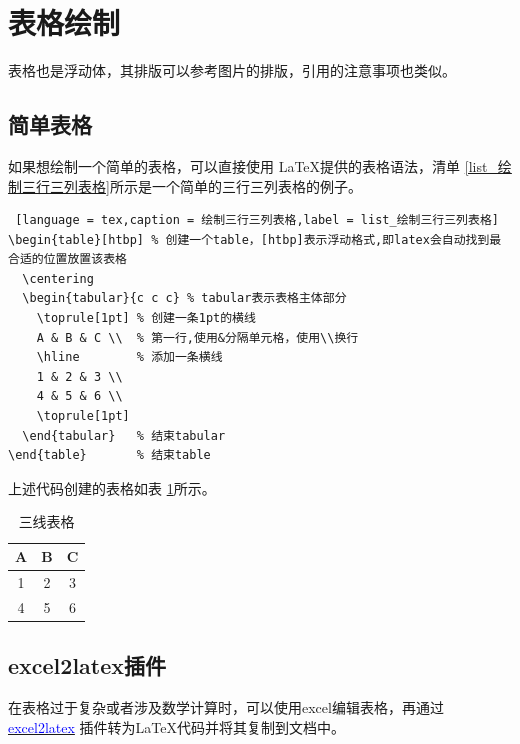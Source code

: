 \documentclass[AutoFakeBold]{ZafuThesis}
\begin{document}
\section{表格绘制}
表格也是浮动体，其排版可以参考图片的排版，引用的注意事项也类似。\par
\subsection{简单表格}
如果想绘制一个简单的表格，可以直接使用 \LaTeX 提供的表格语法，清单 \ref{list_绘制三行三列表格}所示是一个简单的三行三列表格的例子。

\begin{lstlisting} [language = tex,caption = 绘制三行三列表格,label = list_绘制三行三列表格]
\begin{table}[htbp] % 创建一个table，[htbp]表示浮动格式,即latex会自动找到最合适的位置放置该表格
  \centering
  \begin{tabular}{c c c} % tabular表示表格主体部分    
    \toprule[1pt] % 创建一条1pt的横线
    A & B & C \\  % 第一行,使用&分隔单元格，使用\\换行
    \hline        % 添加一条横线
    1 & 2 & 3 \\
    4 & 5 & 6 \\
    \toprule[1pt]
  \end{tabular}   % 结束tabular
\end{table}       % 结束table
\end{lstlisting}\par 
上述代码创建的表格如表 \ref{table_简单三线表格}所示。
\begin{table}[htbp] 
  \centering 
  \caption{三线表格}
  \begin{tabular}{c c c}
    \toprule[1pt]
    A & B & C \\  
    \hline       
    1 & 2 & 3 \\
    4 & 5 & 6 \\
    \toprule[1pt]
  \end{tabular}  
  \label{table_简单三线表格}
\end{table}

\subsection{excel2latex插件}
在表格过于复杂或者涉及数学计算时，可以使用excel编辑表格，再通过 \href{https://ctan.org/tex-archive/support/excel2latex}{\textcolor{blue}{excel2latex}} 插件转为\LaTeX 代码并将其复制到文档中。\par
\end{document}
